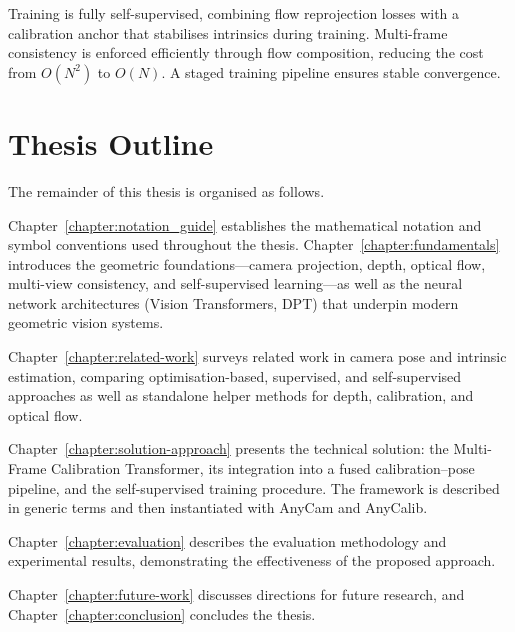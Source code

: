 Training is fully self-supervised, combining flow reprojection losses with a calibration anchor that stabilises intrinsics during training. Multi-frame consistency is enforced efficiently through flow composition, reducing the cost from $O(N^2)$ to $O(N)$. A staged training pipeline ensures stable convergence.

\section{Thesis Outline}\label{sec:outline}

The remainder of this thesis is organised as follows.

Chapter~\ref{chapter:notation_guide} establishes the mathematical notation and symbol conventions used throughout the thesis. Chapter~\ref{chapter:fundamentals} introduces the geometric foundations---camera projection, depth, optical flow, multi-view consistency, and self-supervised learning---as well as the neural network architectures (Vision Transformers, DPT) that underpin modern geometric vision systems.

Chapter~\ref{chapter:related-work} surveys related work in camera pose and intrinsic estimation, comparing optimisation-based, supervised, and self-supervised approaches as well as standalone helper methods for depth, calibration, and optical flow.

Chapter~\ref{chapter:solution-approach} presents the technical solution: the Multi-Frame Calibration Transformer, its integration into a fused calibration--pose pipeline, and the self-supervised training procedure. The framework is described in generic terms and then instantiated with AnyCam and AnyCalib.

Chapter~\ref{chapter:evaluation} describes the evaluation methodology and experimental results, demonstrating the effectiveness of the proposed approach.

Chapter~\ref{chapter:future-work} discusses directions for future research, and Chapter~\ref{chapter:conclusion} concludes the thesis.
